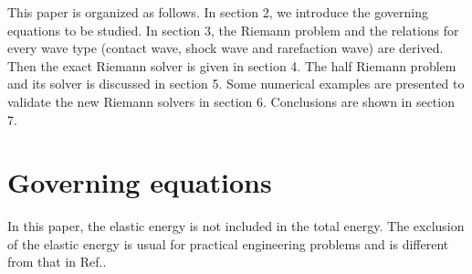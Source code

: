 \documentclass{article}
\numberwithin{equation}{section}
\numberwithin{table}{section}
\begin{document}

This paper is organized as follows. In section 2, we introduce the governing equations to be studied. In section 3, the Riemann problem and the relations for every wave type (contact wave, shock wave and rarefaction wave) are  derived.  Then  the exact Riemann solver  is given in section 4. The half Riemann problem and its solver is  discussed in section 5.  Some numerical examples are presented to validate the new Riemann solvers in section 6.  Conclusions are shown in section 7.

\section{Governing equations}
In this paper, the elastic energy is not included in the total energy. The exclusion of the elastic energy is usual for practical engineering problems \cite{maire2013nominally} and is different from that in Ref.\cite{gavrilyuk2008modelling}.

\end{document}
